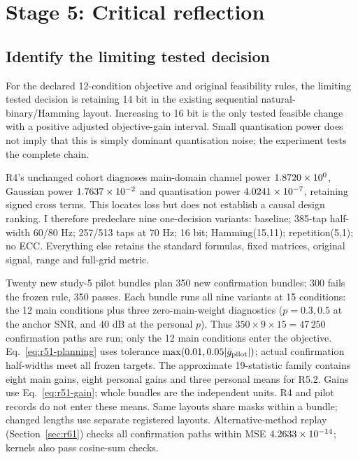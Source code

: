 \FloatBarrier
\section{Stage 5: Critical reflection}
\subsection{Identify the limiting tested decision}
\label{sec:r51}
For the declared 12-condition objective and original feasibility rules,
the limiting tested decision is retaining 14 bit in the existing
sequential natural-binary/Hamming layout. Increasing to 16 bit is the
only tested feasible change with a positive adjusted objective-gain
interval. Small quantisation power does not imply that this is simply
dominant quantisation noise; the experiment tests the complete chain.

R4's unchanged cohort diagnoses main-domain channel power
$1.8720\times10^{0} $, Gaussian power $1.7637\times10^{-2} $ and quantisation
power $4.0241\times10^{-7} $, retaining signed cross terms. This locates loss
but does not establish a causal design ranking. I therefore predeclare
nine one-decision variants: baseline; 385-tap half-width 60/80 Hz;
257/513 taps at 70 Hz; 16 bit; Hamming(15,11); repetition(5,1); no ECC.
Everything else retains the standard formulas, fixed matrices, original
signal, range and full-grid metric.

Twenty new study-5 pilot bundles plan 350 new confirmation bundles;
300 fails the frozen rule, 350 passes. Each bundle runs all nine variants
at 15 conditions: the 12 main conditions plus three zero-main-weight
diagnostics ($p=0.3,0.5$ at the anchor SNR, and 40 dB at the personal $p$).
Thus $350\times9\times15=47\,250$ confirmation paths are run;
only the 12 main conditions enter the objective. Eq.~\eqref{eq:r51-planning}
uses tolerance $\max(0.01,0.05|\bar g_{\rm pilot}|)$; actual confirmation
half-widths meet all frozen targets. The approximate 19-statistic family
contains eight main gains, eight personal gains and three personal
means for R5.2. Gains use Eq.~\eqref{eq:r51-gain}; whole bundles are
the independent units. R4 and pilot records do not enter these means.
Same layouts share masks within a bundle; changed lengths use separate
registered layouts. Alternative-method replay (Section~\ref{sec:r61})
checks all confirmation paths within MSE
$4.2633\times10^{-14}$; kernels also pass cosine-sum checks.

\begin{table}[htbp]
 \centering\small
 \caption{New R5 confirmation: objective and paired gains from 350 bundles, approximate 19-family intervals. Feasibility means original 1 \% gain/twofold expansion rules; absolute rates remain visible.}
 \label{tab:r51-decisions}
 
 
 
\end{table}


